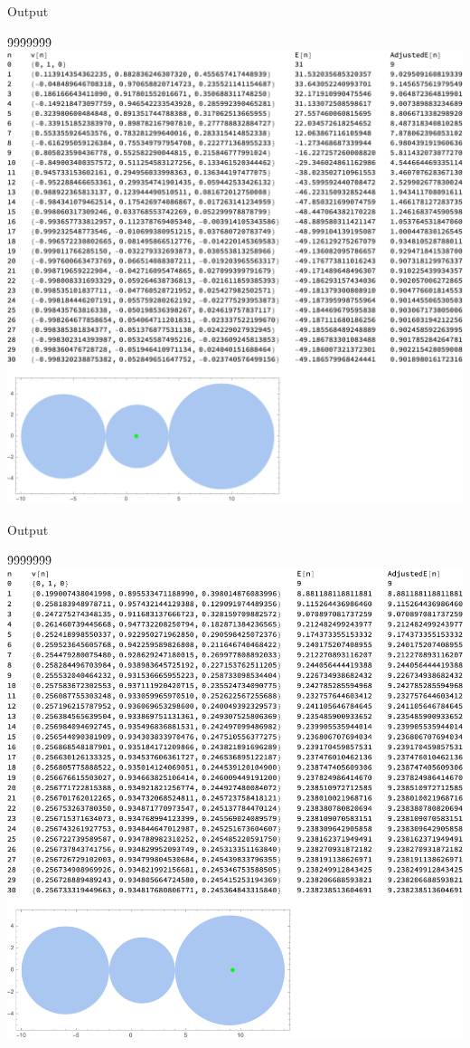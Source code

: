 \documentclass[12pt,twoside,openany]{memoir}
\begin{document}
\begin{solution}
\begin{mmaCell}{Output}

\end{mmaCell}
\h9\h9\h9\h9\h9\h9\h9\includegraphics[scale=0.5]{hw50}

\newpage
\begin{mmaCell}{Output}

\end{mmaCell}
\h9\h9\h9\h9\h9\h9\h9\includegraphics[scale=0.5]{problem51}


\end{solution}
\end{document}
